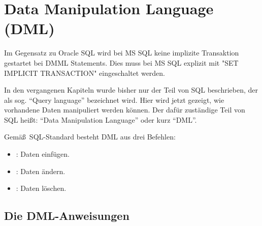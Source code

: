   \chapter{Data Manipulation Language (DML)}
  \chaptertoc{}
  \cleardoubleevenpage
  \begin{merke}
    Im Gegensatz zu Oracle SQL wird bei MS SQL keine implizite Transaktion gestartet
    bei DMML Statements. Dies muss bei MS SQL explizit mit "SET IMPLICIT TRANSACTION" eingeschaltet werden.
  \end{merke}
      In den vergangenen Kapiteln wurde bisher nur der Teil von SQL beschrieben,
      der als sog. \enquote{Query language} bezeichnet wird. Hier wird jetzt
      gezeigt, wie vorhandene Daten manipuliert werden können. Der dafür
      zuständige Teil von SQL heißt: \enquote{Data Manipulation Language}
      oder kurz \enquote{DML}.

      Gemä\ss\ SQL-Standard besteht DML aus drei Befehlen:
      \begin{itemize}
        \item \INSERT: Daten einfügen.
        \item \UPDATE: Daten ändern.
        \item \DELETE: Daten löschen.
      \end{itemize}
    \section{Die DML-Anweisungen}

